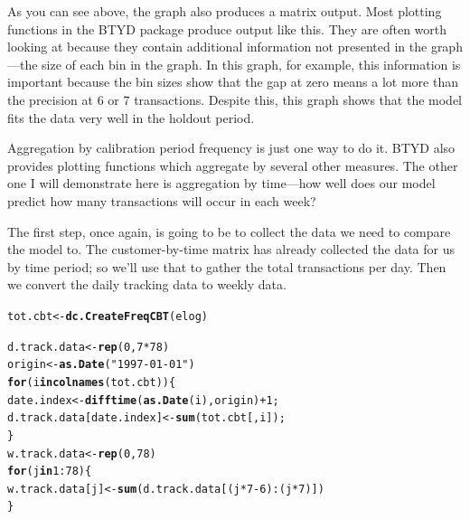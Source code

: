 \documentclass[10pt, letterpaper, onecolumn, oneside, final]{article}\usepackage[]{graphicx}\usepackage[]{color}
\makeatletter
\newcommand{\hlnum}[1]{\textcolor[rgb]{0.686,0.059,0.569}{#1}}%
\newcommand{\hlstr}[1]{\textcolor[rgb]{0.192,0.494,0.8}{#1}}%
\newcommand{\hlopt}[1]{\textcolor[rgb]{0,0,0}{#1}}%
\newcommand{\hlstd}[1]{\textcolor[rgb]{0.345,0.345,0.345}{#1}}%
\newcommand{\hlkwa}[1]{\textcolor[rgb]{0.161,0.373,0.58}{\textbf{#1}}}%
\newcommand{\hlkwb}[1]{\textcolor[rgb]{0.69,0.353,0.396}{#1}}%
\newcommand{\hlkwd}[1]{\textcolor[rgb]{0.737,0.353,0.396}{\textbf{#1}}}%
\newenvironment{kframe}{%
 \def\at@end@of@kframe{}%
 \ifinner\ifhmode%
  \def\at@end@of@kframe{\end{minipage}}%
  \begin{minipage}{\columnwidth}%
 \fi\fi%
 \def\FrameCommand##1{\hskip\@totalleftmargin \hskip-\fboxsep
 \colorbox{shadecolor}{##1}\hskip-\fboxsep
     \hskip-\linewidth \hskip-\@totalleftmargin \hskip\columnwidth}%
 \MakeFramed {\advance\hsize-\width
   \@totalleftmargin\z@ \linewidth\hsize
   \@setminipage}}%
 {\par\unskip\endMakeFramed%
 \at@end@of@kframe}
\newenvironment{knitrout}{}{} %
\makeatother
\begin{document}
As you can see above, the graph also produces a matrix output. Most
plotting functions in the BTYD package produce output like this. They
are often worth looking at because they contain additional information
not presented in the graph---the size of each bin in the graph. In
this graph, for example, this information is important because the bin
sizes show that the gap at zero means a lot more than the precision at
6 or 7 transactions. Despite this, this graph shows that the model
fits the data very well in the holdout period.

Aggregation by calibration period frequency is just one way to do
it. BTYD also provides plotting functions which aggregate by several
other measures. The other one I will demonstrate here is aggregation
by time---how well does our model predict how many transactions will
occur in each week?

The first step, once again, is going to be to collect the data we need
to compare the model to. The customer-by-time matrix has already
collected the data for us by time period; so we'll use that to gather
the total transactions per day. Then we convert the daily tracking
data to weekly data.

\begin{knitrout}
\color{fgcolor}\begin{kframe}
\begin{alltt}
\hlstd{tot.cbt} \hlkwb{<-} \hlkwd{dc.CreateFreqCBT}\hlstd{(elog)}
\end{alltt}


{\ttfamily\noindent\itshape\color{messagecolor}{\# ...Completed Freq CBT}}\begin{alltt}
\hlstd{d.track.data} \hlkwb{<-} \hlkwd{rep}\hlstd{(}\hlnum{0}\hlstd{,} \hlnum{7} \hlopt{*} \hlnum{78}\hlstd{)}
\hlstd{origin} \hlkwb{<-} \hlkwd{as.Date}\hlstd{(}\hlstr{"1997-01-01"}\hlstd{)}
\hlkwa{for} \hlstd{(i} \hlkwa{in} \hlkwd{colnames}\hlstd{(tot.cbt))\{}
  \hlstd{date.index} \hlkwb{<-} \hlkwd{difftime}\hlstd{(}\hlkwd{as.Date}\hlstd{(i), origin)} \hlopt{+} \hlnum{1}\hlstd{;}
  \hlstd{d.track.data[date.index]} \hlkwb{<-} \hlkwd{sum}\hlstd{(tot.cbt[,i]);}
\hlstd{\}}
\hlstd{w.track.data} \hlkwb{<-}  \hlkwd{rep}\hlstd{(}\hlnum{0}\hlstd{,} \hlnum{78}\hlstd{)}
\hlkwa{for} \hlstd{(j} \hlkwa{in} \hlnum{1}\hlopt{:}\hlnum{78}\hlstd{)\{}
  \hlstd{w.track.data[j]} \hlkwb{<-} \hlkwd{sum}\hlstd{(d.track.data[(j}\hlopt{*}\hlnum{7}\hlopt{-}\hlnum{6}\hlstd{)}\hlopt{:}\hlstd{(j}\hlopt{*}\hlnum{7}\hlstd{)])}
\hlstd{\}}
\end{alltt}
\end{kframe}
\end{knitrout}
\end{document}

